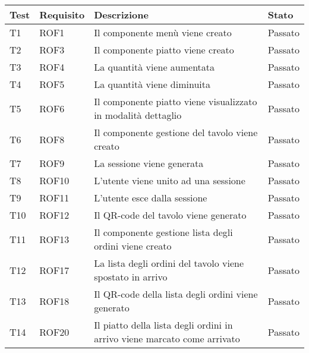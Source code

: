 \begin{center}
    \renewcommand{\arraystretch}{1.5}
    \begin{longtable}{ |p{1cm}|p{1.5cm}|p{9cm}|p{1.5cm}|  }
        \hline
        \hline
        Test&Requisito&Descrizione &Stato \\
        \hline
        \endhead
        T1&ROF1&Il componente menù viene creato&Passato \\
        T2&ROF3&Il componente piatto viene creato&Passato \\
        T3&ROF4&La quantità viene aumentata&Passato \\
        T4&ROF5&La quantità viene diminuita&Passato \\
        T5&ROF6&Il componente piatto viene visualizzato in modalità dettaglio&Passato \\
        T6&ROF8&Il componente gestione del tavolo viene creato &Passato \\
        T7&ROF9&La sessione viene generata&Passato\\
        T8&ROF10&L'utente viene unito ad una sessione&Passato \\
        T9&ROF11&L'utente esce dalla sessione&Passato\\
        T10&ROF12&Il QR-code del tavolo viene generato&Passato\\
        T11&ROF13&Il componente gestione lista degli ordini viene creato&Passato\\
        T12&ROF17&La lista degli ordini del tavolo viene spostato in arrivo&Passato\\
        T13&ROF18&Il QR-code della lista degli ordini viene generato &Passato\\
        T14&ROF20&Il piatto della lista degli ordini in arrivo viene marcato come arrivato&Passato\\

\end{longtable}
\end{center}
